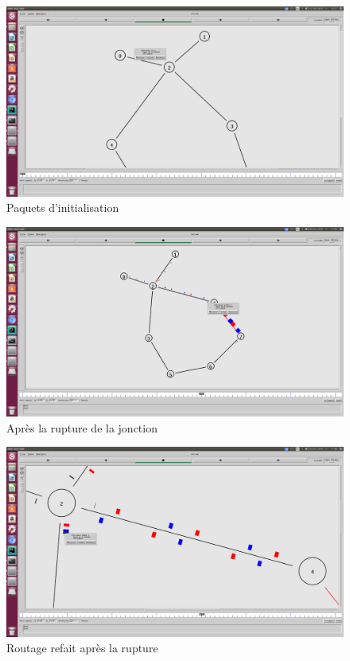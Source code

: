     \begin{figure}
    \centering
    \includegraphics[width=0.99\columnwidth]{./tp2/tp2-1-LS-0-init.png}
    \caption{Paquets d'initialisation}
    \end{figure}
    \begin{figure}
    \centering
    \includegraphics[width=0.99\columnwidth]{./tp2/tp2-1-LS-1-cut.png}
    \caption{Après la rupture de la jonction}
    \end{figure}
    \begin{figure}
    \centering
    \includegraphics[width=0.99\columnwidth]{./tp2/tp2-1-LS-2-cut_riggered.png}
    \caption{Routage refait après la rupture}
    \end{figure}
